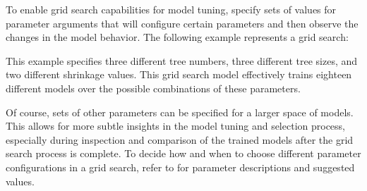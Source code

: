 To enable grid search capabilities for model tuning, specify sets of values for parameter arguments that will configure certain parameters and then observe the changes in the model behavior. The following example represents a grid search:

\begin{minipage}{\textwidth}
\waterExampleInR

\end{minipage}


This example specifies three different tree numbers, three different tree sizes, and two different shrinkage values. This grid search model effectively trains eighteen different models over the possible combinations of these parameters.

Of course, sets of other parameters can be specified for a larger space of models. This allows for more subtle insights in the model tuning and selection process, especially during inspection and comparison of the trained models after the grid search process is complete. To decide how and when to choose different parameter configurations in a grid search, refer to  for parameter descriptions and suggested values.

\begin{minipage}{\textwidth}
\waterExampleInR
 
\end{minipage}



